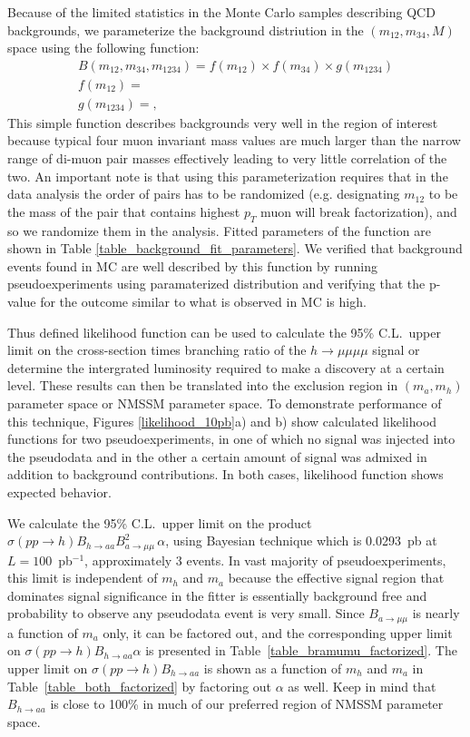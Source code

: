 \documentclass[aps,12pt,superscriptaddress,nofootinbib,floatfix,showpacs]{revtex4}
\begin{document}
Because of the limited statistics in the Monte Carlo samples describing QCD backgrounds, we parameterize the
background distriution in the $(m_{12}, m_{34}, M)$ space using the following function:
\begin{eqnarray}
B(m_{12}, m_{34}, m_{1234}) = f(m_{12}) \times f(m_{34}) \times g(m_{1234}) \\
f(m_{12}) = \\
g(m_{1234}) = ,
\end{eqnarray}
This simple function describes backgrounds very well in the region of interest because typical four muon invariant mass values 
are much larger than the narrow range of di-muon pair masses effectively leading to very little correlation of the two. 
An important note is that using this parameterization requires that in the data analysis the order of pairs has to
be randomized (e.g. designating $m_{12}$ to be the mass of the pair that contains highest $p_T$ muon will break factorization),
and so we randomize them in the analysis. Fitted parameters of the function are shown in Table \ref{table_background_fit_parameters}. 
We verified that background events found in MC are well described by this function by running pseudoexperiments using paramaterized 
distribution and verifying that the p-value for the outcome similar to what is observed in MC is high.

Thus defined likelihood function can be used to calculate the 95\% C.L.\ upper limit on the cross-section times branching ratio
of the $h \to \mu \mu \mu \mu$ signal or determine the intergrated luminosity required to make a discovery at a certain level. 
These results can then be translated into the exclusion region in $(m_a, m_h)$ parameter space or NMSSM parameter space.  
To demonstrate performance of this technique, Figures \ref{likelihood_10pb}a) and b) show calculated likelihood functions 
for two pseudoexperiments, in one of which no signal was injected into the pseudodata and in the other a certain amount of 
signal was admixed in addition to background contributions. In both cases, likelihood function shows expected behavior.

We calculate the 95\% C.L.\ upper limit on the product $\sigma(pp \to h) B_{h \to aa} B^2_{a \to \mu \mu} \, \alpha$, 
using Bayesian technique which is 0.0293~pb at $L = 100$~pb$^{-1}$, approximately 3 events.  In vast majority of 
pseudoexperiments, this limit is independent of $m_h$ and $m_a$ because the effective signal region that dominates 
signal significance in the fitter is essentially background free and probability to observe any pseudodata event is 
very small. Since $B_{a \to \mu\mu}$ is nearly a function of $m_a$ only, it can be factored out, and the corresponding 
upper limit on $\sigma(pp \to h) B_{h \to aa} \alpha$ is presented in Table~\ref{table_bramumu_factorized}.  The upper 
limit on $\sigma(pp \to h) B_{h \to aa}$ is shown as a function of $m_h$ and $m_a$ in Table~\ref{table_both_factorized} 
by factoring out $\alpha$ as well.  Keep in mind that $B_{h \to aa}$ is close to 100\% in much of our preferred region 
of NMSSM parameter space.
\end{document}
